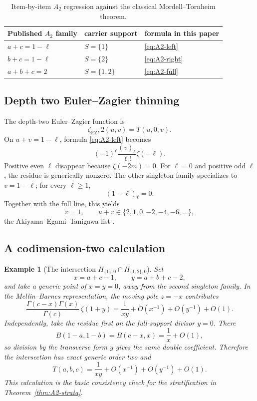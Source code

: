\documentclass[11pt]{article}
\newtheorem{example}[theorem]{Example}
\renewcommand{\boxed}[1]{#1}
\newcommand{\EZ}{\zeta_{\mathrm{EZ}}}
\begin{document}
\begin{table}[ht]
\centering
\small
\begin{tabular}{@{}lll@{}}
\toprule
Published \(A_2\) family & carrier support & formula in this paper\\
\midrule
\(a+c=1-\ell\) & \(S=\{1\}\) & \eqref{eq:A2-left}\\
\(b+c=1-\ell\) & \(S=\{2\}\) & \eqref{eq:A2-right}\\
\(a+b+c=2\) & \(S=\{1,2\}\) & \eqref{eq:A2-full}\\
\bottomrule
\end{tabular}
\caption{Item-by-item \(A_2\) regression against the classical
Mordell--Tornheim theorem.}
\label{tab:A2-comparison}
\end{table}

\subsection{Depth two Euler--Zagier thinning}

The depth-two Euler--Zagier function is
\[
 \EZ,2(u,v)=T(u,0,v).
\]
On \(u+v=1-\ell\), formula \eqref{eq:A2-left} becomes
\[
 (-1)^\ell\frac{(v)_\ell}{\ell!}\zeta(-\ell).
\]
Positive even \(\ell\) disappear because \(\zeta(-2m)=0\).
For \(\ell=0\) and positive odd \(\ell\), the residue is generically
nonzero.  The other singleton family specializes to \(v=1-\ell\);
for every \(\ell\ge1\),
\[
 (1-\ell)_\ell=0.
\]
Together with the full line, this yields
\[
 \boxed{
 v=1,\qquad
 u+v\in\{2,1,0,-2,-4,-6,\ldots\},}
\]
the Akiyama--Egami--Tanigawa list \cite{AET2001}.

\subsection{A codimension-two calculation}

\begin{example}[The intersection \(H_{\{1\},0}\cap H_{\{1,2\},0}\)]
\label{ex:A2-intersection}
Set
\[
 x=a+c-1,\qquad y=a+b+c-2,
\]
and take a generic point of \(x=y=0\), away from the second singleton
family.  In the Mellin--Barnes representation, the moving pole
\(z=-x\) contributes
\[
 \frac{\Gamma(c-x)\Gamma(x)}{\Gamma(c)}\,\zeta(1+y)
 =
 \frac1{xy}+O(x^{-1})+O(y^{-1})+O(1).
\]
Independently, take the residue first on the full-support divisor
\(y=0\).  There
\[
 B(1-a,1-b)=B(c-x,x)=\frac1x+O(1),
\]
so division by the transverse form \(y\) gives the same double
coefficient.  Therefore the intersection has exact generic order two
and
\[
 \boxed{
 T(a,b,c)
 =
 \frac1{xy}
 +O(x^{-1})+O(y^{-1})+O(1).}
\]
This calculation is the basic consistency check for the
stratification in Theorem~\ref{thm:A2-strata}.
\end{example}
\end{document}
